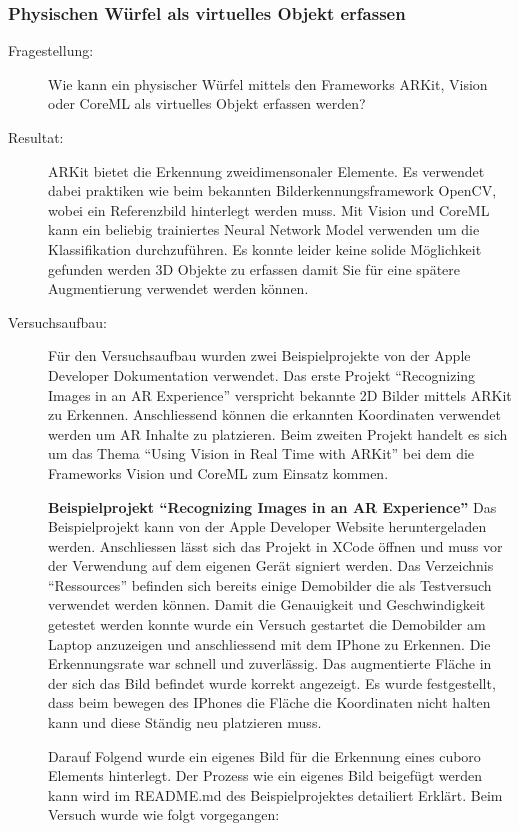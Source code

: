 \subsubsection{Physischen Würfel als virtuelles Objekt erfassen}
\begin{description}
	\item[Fragestellung:] Wie kann ein physischer Würfel mittels den Frameworks ARKit, Vision oder CoreML als virtuelles Objekt erfassen werden?
	\item[Resultat:] ARKit bietet die Erkennung zweidimensonaler Elemente. Es verwendet dabei praktiken wie beim bekannten Bilderkennungsframework OpenCV, wobei ein Referenzbild hinterlegt werden muss.
	Mit Vision und CoreML kann ein beliebig trainiertes Neural Network Model verwenden um die Klassifikation durchzuführen. Es konnte leider keine solide Möglichkeit gefunden werden 3D Objekte zu erfassen damit Sie für eine spätere Augmentierung verwendet werden können. 
	\item[Versuchsaufbau:] Für den Versuchsaufbau wurden zwei Beispielprojekte von der Apple Developer Dokumentation verwendet. Das erste Projekt "`Recognizing Images in an AR Experience"' \cite{arkit-recognize-images} verspricht bekannte 2D Bilder mittels ARKit zu Erkennen. Anschliessend können die erkannten Koordinaten verwendet werden um AR Inhalte zu platzieren.
	Beim zweiten Projekt handelt es sich um das Thema "`Using Vision in Real Time with ARKit"' \cite{vision-real-time-with-arkit} bei dem die Frameworks Vision und CoreML zum Einsatz kommen.

	\textbf{Beispielprojekt "`Recognizing Images in an AR Experience"'}
	Das Beispielprojekt kann von der Apple Developer Website heruntergeladen werden. Anschliessen lässt sich das Projekt in XCode öffnen und muss vor der Verwendung auf dem eigenen Gerät signiert werden. Das Verzeichnis "`Ressources"' befinden sich bereits einige Demobilder die als Testversuch verwendet werden können. Damit die Genauigkeit und Geschwindigkeit getestet werden konnte wurde ein Versuch gestartet die Demobilder am Laptop anzuzeigen und anschliessend mit dem IPhone zu Erkennen. Die Erkennungsrate war schnell und zuverlässig. Das augmentierte Fläche in der sich das Bild befindet wurde korrekt angezeigt. Es wurde festgestellt, dass beim bewegen des IPhones die Fläche die Koordinaten nicht halten kann und diese Ständig neu platzieren muss.

	Darauf Folgend wurde ein eigenes Bild für die Erkennung eines cuboro Elements hinterlegt. Der Prozess wie ein eigenes Bild beigefügt werden kann wird im README.md des Beispielprojektes detailiert Erklärt. Beim Versuch wurde wie folgt vorgegangen: 


\end{description}
